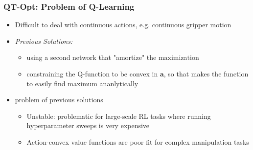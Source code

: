 \documentclass{beamer}
\renewcommand{\vec}[1]{\mathbf{#1}}
\newcommand{\forthSec}{QT-Opt}
\begin{document}
    \begin{frame}
      \frametitle{\forthSec: Problem of Q-Learning}
      \begin{itemize}
        \item Difficult to deal with continuous actions, \footnotesize{e.g. continuous gripper motion}
        \item \normalsize{\textit{Previous Solutions:}}
        \begin{itemize}
          \item using a second network that "amortize" the maximization
          \item constraining the Q-function to be convex in $\vec{a}$, so that makes the function to easily find maximum ananlytically
        \end{itemize}
        \item problem of previous solutions
        \begin{itemize}
          \item Unstable: problematic for large-scale RL tasks where running hyperparameter sweeps is very expensive
          \item Action-convex value functions are poor fit for complex manipulation tasks \\
        \end{itemize}
      \end{itemize}
    \end{frame}
\end{document}
